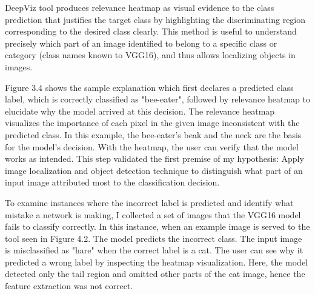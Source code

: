 DeepViz tool produces relevance heatmap as visual evidence to the class prediction that justifies the target class by highlighting the discriminating region corresponding to the desired class clearly. This method is useful to understand precisely which part of an image identified to belong to a specific class or category (class names known to VGG16), and thus allows localizing objects in images.

Figure 3.4 shows the sample explanation which first declares a predicted class label, which is correctly classified as "bee-eater", followed by relevance heatmap to elucidate why the model arrived at this decision. The relevance heatmap visualizes the importance of each pixel in the given image inconsistent with the predicted class. In this example, the bee-eater's beak and the neck are the basis for the model's decision. With the heatmap, the user can verify that the model works as intended.  This step validated the first premise of my hypothesis: Apply image localization and object detection technique to distinguish what part of an input image attributed most to the classification decision.

To examine instances where the incorrect label is predicted and identify what mistake a network is making, I collected a set of images that the VGG16 model fails to classify correctly. In this instance, when an example image is served to the tool seen in Figure 4.2. The model predicts the incorrect class. The input image is misclassified as "hare" when the correct label is a cat. The user can see why it predicted a wrong label by inspecting the heatmap visualization. Here, the model detected only the tail region and omitted other parts of the cat image, hence the feature extraction was not correct.

